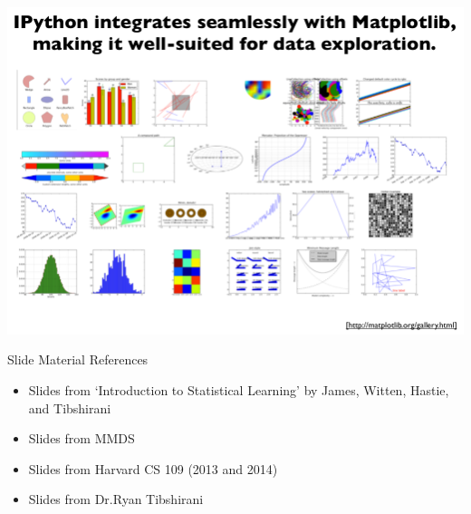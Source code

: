 \documentclass{beamer}
\newcommand{\tblue}[1]{{\Large {\textcolor{azure}{#1}}}}
\begin{document}
\begin{frame}{}
    \begin{center}
        \includegraphics[scale=0.3]{ipythonMatplotlib.png}
    \end{center}
\end{frame}








\begin{frame}{Slide Material References}

\begin{itemize}
    \item Slides from `Introduction to Statistical Learning' by James, Witten, Hastie, and Tibshirani
    \item Slides from MMDS
    \item Slides from Harvard CS 109 (2013 and 2014)
    \item Slides from Dr.Ryan Tibshirani
\end{itemize}
\end{frame}
\end{document}
